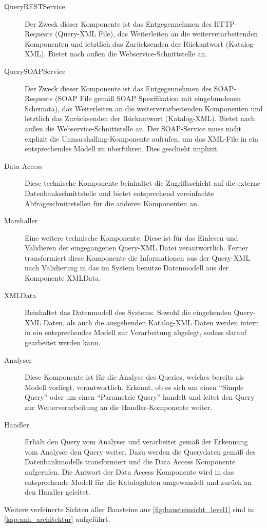 \begin{description}
\item[QueryRESTService] Der Zweck dieser Komponente ist das Entgegennehmen des HTTP-Requests (Query-XML File), das Weiterleiten an die weiterverarbeitenden Komponenten und letztlich das Zurücksenden der Rückantwort (Katalog-XML). Bietet nach außen die \gls{Webservice}-Schnittstelle an.
\item[QuerySOAPService] Der Zweck dieser Komponente ist das Entgegennehmen des SOAP-Requests (SOAP File gemäß SOAP Spezifikation mit eingebundenen Schemata), das Weiterleiten an die weiterverarbeitenden Komponenten und letztlich das Zurücksenden der Rückantwort (Katalog-XML). Bietet nach außen die \gls{Webservice}-Schnittstelle an.
Der SOAP-Service muss nicht explizit die Unmarshalling-Komponente aufrufen, um das XML-File in ein entsprechendes Modell zu überführen. Dies geschieht implizit. 
\item[Data Access] Diese technische Komponente beinhaltet die Zugriffsschicht auf die externe Datenbankschnittstelle und bietet entsprechend vereinfachte Abfrageschnittstellen für die anderen Komponenten an. 
\item[Marshaller] Eine weitere technische Komponente. Diese ist für das Einlesen und Validieren der eingegangenen Query-XML Datei verantwortlich. Ferner transformiert diese Komponente die Informationen aus der Query-XML nach Validierung in das im System benutze Datenmodell aus der Komponente XMLData.
\item[XMLData] Beinhaltet das Datenmodell des Systems. Sowohl die eingehenden Query-XML Daten, als auch die ausgehenden Katalog-XML Daten werden intern in ein entsprechendes Modell zur Verarbeitung abgelegt, sodass darauf gearbeitet werden kann.  
\item[Analyser] Diese Komponente ist für die Analyse des Queries, welches bereits als Modell vorliegt, verantwortlich. Erkennt, ob es sich um einen \enquote{Simple Query} oder um einen \enquote{Parametric Query} handelt und leitet den Query zur Weiterverarbeitung an die Handler-Komponente weiter. 
\item[Handler] Erhält den Query vom Analyser und verarbeitet gemäß der Erkennung vom Analyser den Query weiter. Dazu werden die Querydaten gemäß des Datenbankmodells transformiert und die Data Access Komponente aufgerufen. Die Antwort der Data Access Komponente wird in das entsprechende Modell für die Katalogdaten umgewandelt und zurück an den Handler geleitet.  
\end{description}

Weitere verfeinerte Sichten aller Bausteine aus \autoref{fig:bausteinsicht_level1} sind in \autoref{kap:anh_architektur} aufgeführt. 
